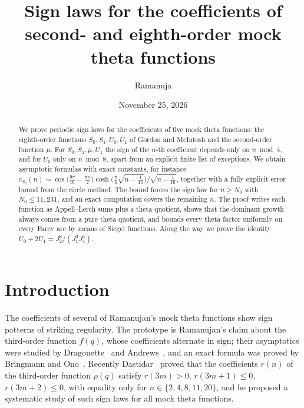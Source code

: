 \documentclass[11pt]{amsart}
\theoremstyle{definition}
\theoremstyle{remark}
\numberwithin{equation}{section}
\begin{document}
\title[Sign laws for mock theta functions]{Sign laws for the coefficients of second- and eighth-order mock theta functions}

\author{Ramanuja}
\address{Kachhubi, P.O.\ Tamuria, Lakhnaur Block, Madhubani, Bihar 847410, India}


\date{November 25, 2026}

\begin{abstract}
We prove periodic sign laws for the coefficients of five mock theta functions: the eighth-order functions $S_0,S_1,U_0,U_1$ of Gordon and McIntosh and the second-order function $\mu$.
For $S_0,S_1,\mu,U_1$ the sign of the $n$-th coefficient depends only on $n \bmod 4$, and for $U_0$ only on $n\bmod 8$, apart from an explicit finite list of exceptions.
We obtain asymptotic formulas with exact constants, for instance
$c_{S_0}(n)\sim \cos\!\big(\tfrac{9\pi}{16}-\tfrac{\pi n}{2}\big)\cosh\!\big(\tfrac{\pi}{4}\sqrt{n-\tfrac1{16}}\big)\big/\sqrt{n-\tfrac1{16}}$,
together with a fully explicit error bound from the circle method.
The bound forces the sign law for $n\ge N_0$ with $N_0\le 11{,}231$, and an exact computation covers the remaining $n$.
The proof writes each function as Appell--Lerch sums plus a theta quotient, shows that the dominant growth always comes from a pure theta quotient, and bounds every theta factor uniformly on every Farey arc by means of Siegel functions.
Along the way we prove the identity $U_0+2U_1=J_2^8/(J_1^3J_4^4)$.
\end{abstract}

\maketitle

\section{Introduction}

The coefficients of several of Ramanujan's mock theta functions show sign patterns of striking regularity.
The prototype is Ramanujan's claim about the third-order function $f(q)$, whose coefficients alternate in sign; their asymptotics were studied by Dragonette~\cite{Dr} and Andrews~\cite{An}, and an exact formula was proved by Bringmann and Ono~\cite{BO}.
Recently Dastidar~\cite{Da} proved that the coefficients $r(n)$ of the third-order function $\rho(q)$ satisfy
$r(3m)>0$, $r(3m+1)\le 0$, $r(3m+2)\le 0$, with equality only for $n\in\{2,4,8,11,20\}$, and he proposed a systematic study of such sign laws for all mock theta functions.
\end{document}

